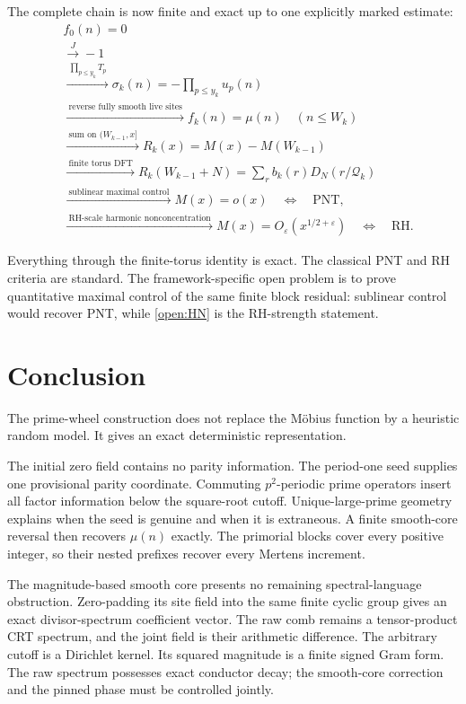 \documentclass[11pt]{article}
\theoremstyle{definition}
\begin{document}
The complete chain is now finite and exact up to one explicitly marked estimate:
\begin{align*}
&f_0(n)=0\\
&\xrightarrow{\ J\ } -1\\
&\xrightarrow{\ \prod_{p\le y_k}T_p\ }
\sigma_k(n)=-\prod_{p\le y_k}u_p(n)\\
&\xrightarrow{\ \text{reverse fully smooth live sites}\ }
f_k(n)=\mu(n)\quad(n\le W_k)\\
&\xrightarrow{\ \text{sum on }(W_{k-1},x]\ }
R_k(x)=M(x)-M(W_{k-1})\\
&\xrightarrow{\ \text{finite torus DFT}\ }
R_k(W_{k-1}+N)=\sum_r b_k(r)D_N(r/\mathcal Q_k)\\
&\xrightarrow{\ \text{sublinear maximal control}\ }
M(x)=o(x)\quad\Longleftrightarrow\quad\mathrm{PNT},\\
&\xrightarrow{\ \text{RH-scale harmonic nonconcentration}\ }
M(x)=O_{\varepsilon}(x^{1/2+\varepsilon})
\quad\Longleftrightarrow\quad\mathrm{RH}.
\end{align*}

Everything through the finite-torus identity is exact.  The classical PNT and RH criteria are standard.  The framework-specific open problem is to prove quantitative maximal control of the same finite block residual: sublinear control would recover PNT, while \cref{open:HN} is the RH-strength statement.

\section{Conclusion}

The prime-wheel construction does not replace the M\"obius function by a heuristic random model.  It gives an exact deterministic representation.

The initial zero field contains no parity information.  The period-one seed supplies one provisional parity coordinate.  Commuting $p^2$-periodic prime operators insert all factor information below the square-root cutoff.  Unique-large-prime geometry explains when the seed is genuine and when it is extraneous.  A finite smooth-core reversal then recovers $\mu(n)$ exactly.  The primorial blocks cover every positive integer, so their nested prefixes recover every Mertens increment.

The magnitude-based smooth core presents no remaining spectral-language obstruction.  Zero-padding its site field into the same finite cyclic group gives an exact divisor-spectrum coefficient vector.  The raw comb remains a tensor-product CRT spectrum, and the joint field is their arithmetic difference.  The arbitrary cutoff is a Dirichlet kernel.  Its squared magnitude is a finite signed Gram form.  The raw spectrum possesses exact conductor decay; the smooth-core correction and the pinned phase must be controlled jointly.
\end{document}
